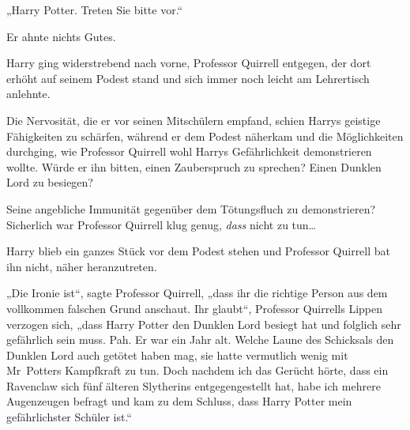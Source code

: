 „Harry Potter. Treten Sie bitte vor.“

Er ahnte nichts Gutes.

Harry ging widerstrebend nach vorne, Professor Quirrell entgegen, der dort erhöht auf seinem Podest stand und sich immer noch leicht am Lehrertisch anlehnte.

Die Nervosität, die er vor seinen Mitschülern empfand, schien Harrys geistige Fähigkeiten zu schärfen, während er dem Podest näherkam und die Möglichkeiten durchging, wie Professor Quirrell wohl Harrys Gefährlichkeit demonstrieren wollte. Würde er ihn bitten, einen Zauberspruch zu sprechen? Einen Dunklen Lord zu besiegen?

Seine angebliche Immunität gegenüber dem Tötungsfluch zu demonstrieren? Sicherlich war Professor Quirrell klug genug, \emph{dass} nicht zu tun…

Harry blieb ein ganzes Stück vor dem Podest stehen und Professor Quirrell bat ihn nicht, näher heranzutreten.

„Die Ironie ist“, sagte Professor Quirrell, „dass ihr die richtige Person aus dem vollkommen falschen Grund anschaut. Ihr glaubt“, Professor Quirrells Lippen verzogen sich, „dass Harry Potter den Dunklen Lord besiegt hat und folglich sehr gefährlich sein muss. Pah. Er war ein Jahr alt. Welche Laune des Schicksals den Dunklen Lord auch getötet haben mag, sie hatte vermutlich wenig mit Mr~Potters Kampfkraft zu tun. Doch nachdem ich das Gerücht hörte, dass ein Ravenclaw sich fünf älteren Slytherins entgegengestellt hat, habe ich mehrere Augenzeugen befragt und kam zu dem Schluss, dass Harry Potter mein gefährlichster Schüler ist.“

